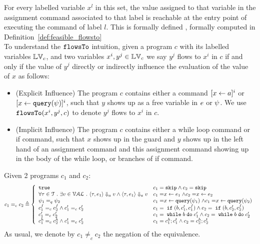 For every labelled variable $x^l$ in this set, 
the value assigned to that variable
in the assignment command associated to that label is reachable at the entry point of  executing the command of label $l$.
This is formally defined , formally computed in Definition~\ref{def:feasible_flowsto}
\\
To understand the $\mathtt{flowsTo}$ intuition, 
given a program  ${c}$ with its labelled variables $\mathbb{LV}_c$, and two variables ${x^i}, y^j  \in \mathbb{LV}_c $ 
we say $y^j$ flows to ${x^i}$ in ${c}$ if and only if 
the value of $y^j$ directly or indirectly influence the evaluation of the value of ${x}$ as follows:
%
\begin{itemize}
\item (Explicit Influence) The program ${c}$ contains either 
a command $[\mathrel{ {x} \leftarrow a }]^i$ or $[\mathrel{ {x} \leftarrow {\tt query}({\psi}) }]^i$,
such that ${y}$ shows up as a free variable in $e$ or ${\psi}$.
We use $\mathtt{flowsTo}({x^i, y^j, c})$ to denote $y^j$ flows to $x^i$ in ${c}$.
%
\item (Implicit Influence) The program ${c}$ contains either a while loop
command
or if command, 
such that $x$ shows up in the guard
and $y$ shows up in the left hand of an assignment command and this assignment command showing up
 in the body of the while loop, or branches of if command.
\end{itemize}
%
%
%
\begin{defn}
%
\label{def:aq_prog}
Given 2 programs $c_1$ and $c_2$:
\[
c_1 =_{c} c_2
\triangleq 
\left\{
  \begin{array}{ll} 
    \etrue        
    & c_1 = \eskip \land c_2 = \eskip
    \\ 
    \forall \trace \in \mathcal{T} \st \exists v \in \mathcal{VAL}
    \st \config{ \trace, \expr_1} \aarrow v \land \config{ \trace, \expr_1} \aarrow v     
    & c_1 = \assign{x}{\expr_1} \land c_2 = \assign{x}{\expr_2} 
    \\ 
    \qexpr_1 =_{q} \qexpr_2       
    & c_1 = \assign{x}{\query(\qexpr_1)} \land c_1 = \assign{x}{\query(\qexpr_2)} 
    \\
    c_1^f =_{c} c_2^f \land c_1^t =_{c} c_2^t
    & c_1 = \eif(b, c_1^t, c_1^f) \land c_2 = \eif(b, c_2^t, c_2^f)
    \\ 
    c_1' =_{c} c_2'         
    & c_1 = \ewhile b \edo c_1' \land c_2 = \ewhile b \edo c_2'
    \\ 
    c_1^h =_{c} c_2^h \land c_1^t =_{c} c_2^t
    & c_1 = c_1^h;c_1^t \land c_2 = c_2^h;c_2^t 
  \end{array}
  \right.
\]
%
As usual, we denote by $c_1 \neq_{c} c_2$ the negation of the equivalence.
%
\end{defn}
